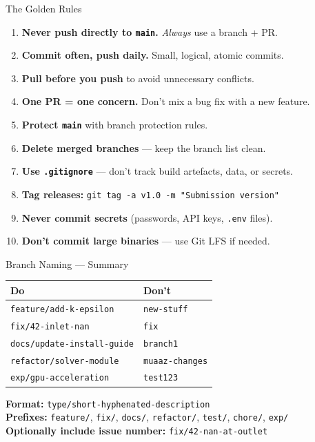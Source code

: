 \documentclass[aspectratio=169, 11pt]{beamer}
\begin{document}
\begin{frame}{The Golden Rules}
  \begin{enumerate}
    \item \textbf{Never push directly to \texttt{main}.} \emph{Always} use a branch + PR.
    \item \textbf{Commit often, push daily.} Small, logical, atomic commits.
    \item \textbf{Pull before you push} to avoid unnecessary conflicts.
    \item \textbf{One PR = one concern.} Don't mix a bug fix with a new feature.
    \item \textbf{Protect \texttt{main}} with branch protection rules.
    \item \textbf{Delete merged branches} --- keep the branch list clean.
    \item \textbf{Use \texttt{.gitignore}} --- don't track build artefacts, data, or secrets.
    \item \textbf{Tag releases:} \texttt{git tag -a v1.0 -m "Submission version"}
    \item \textbf{Never commit secrets} (passwords, API keys, \texttt{.env} files).
    \item \textbf{Don't commit large binaries} --- use Git LFS if needed.
  \end{enumerate}
\end{frame}

\begin{frame}{Branch Naming --- Summary}
  \begin{table}
    \centering
    \begin{tabular}{@{} l l @{}}
      \toprule
      \textbf{Do} & \textbf{Don't} \\
      \midrule
      \texttt{feature/add-k-epsilon}     & \texttt{new-stuff} \\
      \texttt{fix/42-inlet-nan}          & \texttt{fix} \\
      \texttt{docs/update-install-guide} & \texttt{branch1} \\
      \texttt{refactor/solver-module}    & \texttt{muaaz-changes} \\
      \texttt{exp/gpu-acceleration}      & \texttt{test123} \\
      \bottomrule
    \end{tabular}
  \end{table}

  \vspace{0.5em}
  \textbf{Format:} \texttt{type/short-hyphenated-description}\\
  \textbf{Prefixes:} \texttt{feature/}, \texttt{fix/}, \texttt{docs/}, \texttt{refactor/}, \texttt{test/}, \texttt{chore/}, \texttt{exp/}\\
  \textbf{Optionally include issue number:} \texttt{fix/42-nan-at-outlet}
\end{frame}
\end{document}
